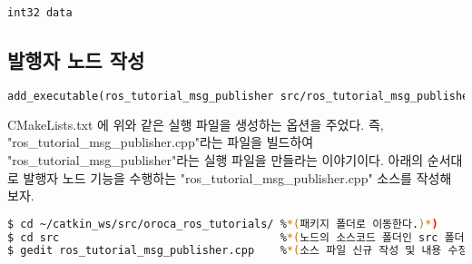 \begin{lstlisting}[language=ROS]
int32 data
\end{lstlisting}

\subsection{발행자 노드 작성}

\begin{lstlisting}[language=make]
add_executable(ros_tutorial_msg_publisher src/ros_tutorial_msg_publisher.cpp)
\end{lstlisting}

CMakeLists.txt 에 위와 같은 실행 파일을 생성하는 옵션을 주었다. 즉, "ros\_tutorial\_msg\_publisher.cpp"라는 파일을 빌드하여 "ros\_tutorial\_msg\_publisher"라는 실행 파일을 만들라는 이야기이다. 아래의 순서대로 발행자 노드 기능을 수행하는 "ros\_tutorial\_msg\_publisher.cpp" 소스를 작성해 보자. 

\begin{lstlisting}[language=bash]
$ cd ~/catkin_ws/src/oroca_ros_tutorials/ %*(패키지 폴더로 이동한다.)*)
$ cd src                                  %*(노드의 소스코드 폴더인 src 폴더로 이동)*)
$ gedit ros_tutorial_msg_publisher.cpp    %*(소스 파일 신규 작성 및 내용 수정)*)
\end{lstlisting}

